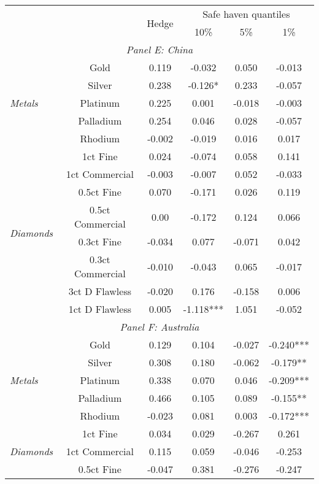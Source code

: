 \begin{tabularx}{1\textwidth}{Xccccc}
\toprule
 &    & \multirow{2}{*}{Hedge}  & \multicolumn{3}{c}{Safe haven quantiles} \\
\cmidrule(l{0.25em}){4-6} 
     &     &     & 10\% & 5\% & 1\% \\
\midrule
\multicolumn{6}{c}{\emph{Panel E: China}} \\
\multirow{5}{*}{\emph{Metals}} & Gold & 0.119 & -0.032 & 0.050 & -0.013 \\
								& Silver & 0.238 & -0.126* & 0.233 & -0.057 \\
								& Platinum & 0.225 & 0.001 & -0.018 & -0.003 \\
								& Palladium & 0.254 & 0.046 & 0.028 & -0.057 \\
								& Rhodium & -0.002 & -0.019 & 0.016 & 0.017 \\
\midrule
\multirow{8}{*}{\emph{Diamonds}} & 1ct Fine & 0.024 & -0.074 & 0.058 & 0.141 \\
								& 1ct Commercial & -0.003 & -0.007 & 0.052 & -0.033 \\
								& 0.5ct Fine & 0.070 & -0.171 & 0.026 & 0.119 \\
								& 0.5ct Commercial & 0.00 & -0.172 & 0.124 & 0.066 \\
								& 0.3ct Fine & -0.034 & 0.077 & -0.071 & 0.042 \\
								& 0.3ct Commercial & -0.010 & -0.043 & 0.065 & -0.017 \\
								& 3ct D Flawless & -0.020 & 0.176 & -0.158 & 0.006 \\
								& 1ct D Flawless & 0.005 & -1.118*** & 1.051 & -0.052 \\
\midrule
\multicolumn{6}{c}{\emph{Panel F: Australia}} \\
\multirow{5}{*}{\emph{Metals}} & Gold & 0.129 & 0.104 & -0.027 & -0.240*** \\
								& Silver & 0.308 & 0.180 & -0.062 & -0.179** \\
								& Platinum & 0.338 & 0.070 & 0.046 & -0.209*** \\
								& Palladium & 0.466 & 0.105 & 0.089 & -0.155** \\
								& Rhodium & -0.023 & 0.081 & 0.003 & -0.172*** \\
\midrule
\multirow{8}{*}{\emph{Diamonds}} & 1ct Fine & 0.034 & 0.029 & -0.267 & 0.261 \\
								& 1ct Commercial & 0.115 & 0.059 & -0.046 & -0.253 \\
								& 0.5ct Fine & -0.047 & 0.381 & -0.276 & -0.247 \\

\end{tabularx}
